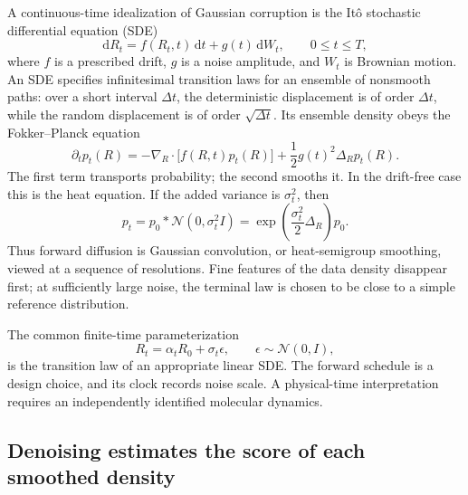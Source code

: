 A continuous-time idealization of Gaussian corruption is the It\^o stochastic differential
equation (SDE)
\begin{equation}
\mathrm dR_t=f(R_t,t)\,\mathrm dt+g(t)\,\mathrm dW_t,
\qquad 0\leq t\leq T,
\label{eq:book-af3-forward-sde}
\end{equation}
where $f$ is a prescribed drift, $g$ is a noise amplitude, and $W_t$ is Brownian motion.  An SDE
specifies infinitesimal transition laws for an ensemble of nonsmooth paths: over a short interval
$\Delta t$, the deterministic displacement is of order $\Delta t$, while the random displacement
is of order $\sqrt{\Delta t}$.  Its ensemble density obeys the Fokker--Planck equation
\begin{equation}
\partial_t p_t(R)
=-\nabla_R\!\cdot\!\bigl[f(R,t)p_t(R)\bigr]
+\frac12g(t)^2\Delta_Rp_t(R).
\label{eq:book-af3-fokker-planck}
\end{equation}
The first term transports probability; the second smooths it.  In the drift-free case this is the
heat equation.  If the added variance is $\sigma_t^2$, then
\begin{equation}
p_t=p_0*\mathcal N(0,\sigma_t^2I)
=\exp\!\left(\frac{\sigma_t^2}{2}\Delta_R\right)p_0.
\label{eq:book-af3-heat-semigroup}
\end{equation}
Thus forward diffusion is Gaussian convolution, or heat-semigroup smoothing, viewed at a sequence
of resolutions.  Fine features of the data density disappear first; at sufficiently large noise,
the terminal law is chosen to be close to a simple reference distribution.

The common finite-time parameterization
\begin{equation}
R_t=\alpha_tR_0+\sigma_t\epsilon,
\qquad \epsilon\sim\mathcal N(0,I),
\label{eq:book-af3-gaussian-corruption}
\end{equation}
is the transition law of an appropriate linear SDE.  The forward schedule is a design choice, and
its clock records noise scale.  A physical-time interpretation requires an independently identified
molecular dynamics.

\subsection{Denoising estimates the score of each smoothed density}

